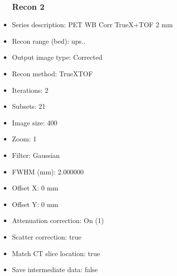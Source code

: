 \documentclass[12pt]{article}
\begin{document}
\begin{itemize}
\subsubsection{Recon 2}
\item Series description: PET WB Corr TrueX+TOF 2 mm
\item Recon range (bed): ups..
\item Output image type: Corrected
\item Recon method: TrueXTOF
\item Iterations: 2
\item Subsets: 21
\item Image size: 400
\item Zoom: 1
\item Filter: Gaussian
\item FWHM (mm): 2.000000
\item Offset X: 0 mm
\item Offset Y: 0 mm
\item Attenuation correction: On (1)
\item Scatter correction: true
\item Match CT slice location: true
\item Save intermediate data: false
\end{itemize}
\end{document}
